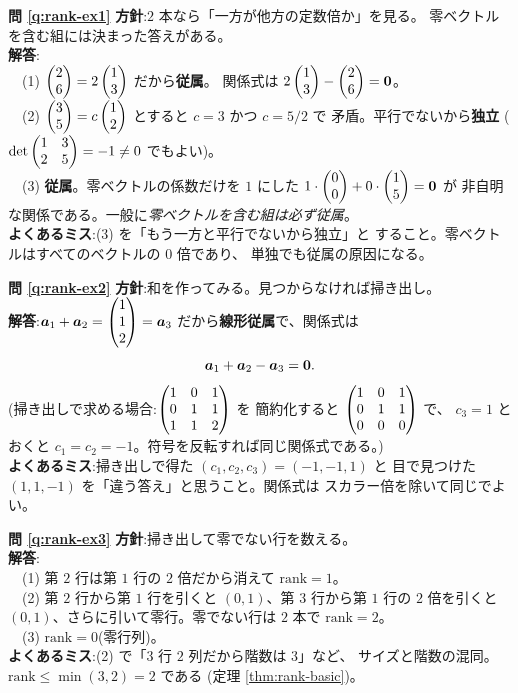 \bigskip
\noindent\textbf{問 \ref{q:rank-ex1}}\quad
\textbf{方針}:$2$ 本なら「一方が他方の定数倍か」を見る。
零ベクトルを含む組には決まった答えがある。\\
\textbf{解答}:\\
　(1) $\begin{pmatrix}2 \\ 6\end{pmatrix} = 2\begin{pmatrix}1 \\ 3\end{pmatrix}$ だから\textbf{従属}。
関係式は $2\begin{pmatrix}1 \\ 3\end{pmatrix} - \begin{pmatrix}2 \\ 6\end{pmatrix} = \bm{0}$。\\
　(2) $\begin{pmatrix}3 \\ 5\end{pmatrix} = c\begin{pmatrix}1 \\ 2\end{pmatrix}$ とすると $c = 3$ かつ $c = 5/2$ で
矛盾。平行でないから\textbf{独立}
($\det \begin{pmatrix}1 & 3 \\ 2 & 5\end{pmatrix} = -1 \neq 0$ でもよい)。\\
　(3) \textbf{従属}。零ベクトルの係数だけを $1$ にした
$1 \cdot \begin{pmatrix}0 \\ 0\end{pmatrix} + 0 \cdot \begin{pmatrix}1 \\ 5\end{pmatrix} = \bm{0}$ が
非自明な関係である。一般に\emph{零ベクトルを含む組は必ず従属}。\\
\textbf{よくあるミス}:(3) を「もう一方と平行でないから独立」と
すること。零ベクトルはすべてのベクトルの $0$ 倍であり、
単独でも従属の原因になる。

\bigskip
\noindent\textbf{問 \ref{q:rank-ex2}}\quad
\textbf{方針}:和を作ってみる。見つからなければ掃き出し。\\
\textbf{解答}:$\bm{a}_1 + \bm{a}_2 = \begin{pmatrix}1 \\ 1 \\ 2\end{pmatrix} = \bm{a}_3$
だから\textbf{線形従属}で、関係式は
\[
\bm{a}_1 + \bm{a}_2 - \bm{a}_3 = \bm{0}.
\]
(掃き出しで求める場合:$\begin{pmatrix}1 & 0 & 1 \\ 0 & 1 & 1 \\ 1 & 1 & 2\end{pmatrix}$ を
簡約化すると $\begin{pmatrix}1 & 0 & 1 \\ 0 & 1 & 1 \\ 0 & 0 & 0\end{pmatrix}$ で、
$c_3 = 1$ とおくと $c_1 = c_2 = -1$。符号を反転すれば同じ関係式である。)\\
\textbf{よくあるミス}:掃き出しで得た $(c_1, c_2, c_3) = (-1, -1, 1)$ と
目で見つけた $(1, 1, -1)$ を「違う答え」と思うこと。関係式は
スカラー倍を除いて同じでよい。

\bigskip
\noindent\textbf{問 \ref{q:rank-ex3}}\quad
\textbf{方針}:掃き出して零でない行を数える。\\
\textbf{解答}:\\
　(1) 第 $2$ 行は第 $1$ 行の $2$ 倍だから消えて
$\mathrm{rank} = 1$。\\
　(2) 第 $2$ 行から第 $1$ 行を引くと $(0, 1)$、第 $3$ 行から第 $1$ 行の
$2$ 倍を引くと $(0, 1)$、さらに引いて零行。零でない行は $2$ 本で
$\mathrm{rank} = 2$。\\
　(3) $\mathrm{rank} = 0$(零行列)。\\
\textbf{よくあるミス}:(2) で「$3$ 行 $2$ 列だから階数は $3$」など、
サイズと階数の混同。$\mathrm{rank} \le \min(3, 2) = 2$ である
(定理 \ref{thm:rank-basic})。

